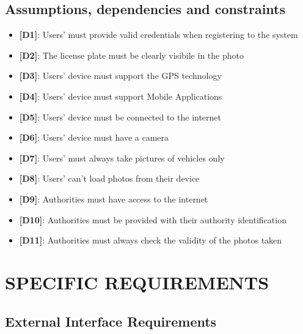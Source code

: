 \documentclass[12pt,a4paper]{article}
\begin{document}
\subsection{Assumptions, dependencies and constraints}
 \begin{itemize}
				\item {\textbf[}\textbf{D1}{\textbf]}: Users' must provide valid credentials when registering to the system
				\item {\textbf[}\textbf{D2}{\textbf]}: The license plate must be clearly visibile in the photo
				\item {\textbf[}\textbf{D3}{\textbf]}: Users' device must support the GPS technology
				\item {\textbf[}\textbf{D4}{\textbf]}: Users' device must support Mobile Applications
				\item {\textbf[}\textbf{D5}{\textbf]}: Users' device must be connected to the internet
				\item {\textbf[}\textbf{D6}{\textbf]}: Users' device must have a camera
				\item {\textbf[}\textbf{D7}{\textbf]}: Users' must always take pictures of vehicles only
				\item {\textbf[}\textbf{D8}{\textbf]}: Users' can't load photos from their device 
				\item {\textbf[}\textbf{D9}{\textbf]}: Authorities must have access to the internet
				\item {\textbf[}\textbf{D10}{\textbf]}: Authorities must be provided with their authority identification
				\item {\textbf[}\textbf{D11}{\textbf]}: Authorities must always check the validity of the photos taken
			\end{itemize}

\newpage

\section{SPECIFIC REQUIREMENTS}
\subsection{External Interface Requirements} 
\end{document}
